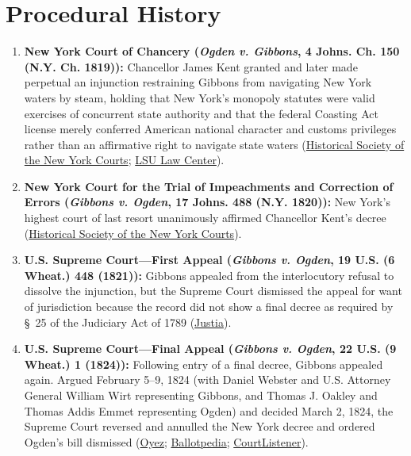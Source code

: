 \documentclass[12pt]{article}
\begin{document}
\section{Procedural History}
\begin{enumerate}
\item \textbf{New York Court of Chancery (\textit{Ogden v. Gibbons}, 4 Johns. Ch. 150 (N.Y. Ch. 1819)):} Chancellor James Kent granted and later made perpetual an injunction restraining Gibbons from navigating New York waters by steam, holding that New York's monopoly statutes were valid exercises of concurrent state authority and that the federal Coasting Act license merely conferred American national character and customs privileges rather than an affirmative right to navigate state waters (\href{https://history.nycourts.gov/wp-content/uploads/2026/05/25_Judicial_Notice-compressed.pdf}{Historical Society of the New York Courts}; \href{https://biotech.law.lsu.edu/cases/pp/Gibbons.htm}{LSU Law Center}).
\item \textbf{New York Court for the Trial of Impeachments and Correction of Errors (\textit{Gibbons v. Ogden}, 17 Johns. 488 (N.Y. 1820)):} New York's highest court of last resort unanimously affirmed Chancellor Kent's decree (\href{https://history.nycourts.gov/wp-content/uploads/2026/05/25_Judicial_Notice-compressed.pdf}{Historical Society of the New York Courts}).
\item \textbf{U.S. Supreme Court---First Appeal (\textit{Gibbons v. Ogden}, 19 U.S. (6 Wheat.) 448 (1821)):} Gibbons appealed from the interlocutory refusal to dissolve the injunction, but the Supreme Court dismissed the appeal for want of jurisdiction because the record did not show a final decree as required by \S~25 of the Judiciary Act of 1789 (\href{https://supreme.justia.com/cases/federal/us/19/448/}{Justia}).
\item \textbf{U.S. Supreme Court---Final Appeal (\textit{Gibbons v. Ogden}, 22 U.S. (9 Wheat.) 1 (1824)):} Following entry of a final decree, Gibbons appealed again. Argued February 5--9, 1824 (with Daniel Webster and U.S. Attorney General William Wirt representing Gibbons, and Thomas J. Oakley and Thomas Addis Emmet representing Ogden) and decided March 2, 1824, the Supreme Court reversed and annulled the New York decree and ordered Ogden's bill dismissed (\href{https://www.oyez.org/cases/1789-1850/22us1}{Oyez}; \href{https://ballotpedia.org/Gibbons_v._Ogden}{Ballotpedia}; \href{https://www.courtlistener.com/opinion/85412/gibbons-v-ogden/}{CourtListener}).
\end{enumerate}
\end{document}
